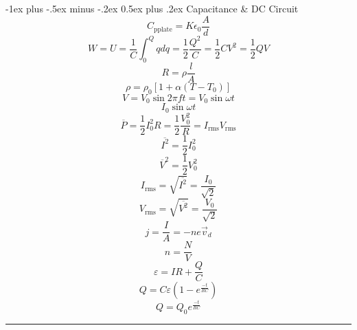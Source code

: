\documentclass[12pt,landscape]{article}
\makeatletter
\renewcommand{\section}{\@startsection{section}{1}{0mm}%
                                {-1ex plus -.5ex minus -.2ex}%
                                {0.5ex plus .2ex}%
                                {\normalfont\large\bfseries}}
\renewcommand{\subsection}{\@startsection{subsection}{2}{0mm}%
                                {-1explus -.5ex minus -.2ex}%
                                {0.5ex plus .2ex}%
                                {\normalfont\normalsize\bfseries}}
\makeatother
\begin{document}
\begin{multicols}{3}
\section{Capacitance \& DC Circuit}
\begin{equation*}
    C_{\text{pplate}} = K \epsilon_0 \frac{A}{d}
\end{equation*}
\begin{equation*}
    W = U = \frac{1}{C} \int_{0}^{Q} q dq = \frac{1}{2}\frac{Q^2}{C} = \frac{1}{2} CV^2 = \frac{1}{2}QV
\end{equation*}
\begin{equation*}
    R = \rho \frac{l}{A}
\end{equation*}
\begin{equation*}
    \rho = \rho_0 [1 + \alpha(T - T_0)]
\end{equation*}
\begin{equation*}
    V = V_0 \sin{2\pi f} t = V_0 \sin{\omega t}
\end{equation*}
\begin{equation*}
    I_0 \sin{\omega t}
\end{equation*}
\begin{equation*}
    \overbar{P} = \frac{1}{2} I_0^2 R = \frac{1}{2} \frac{V_0^2}{R}= I_{\text{rms}} V_{\text{rms}}
\end{equation*}
\begin{equation*}
    \overbar{I^2} = \frac{1}{2} I_0^2
\end{equation*}
\begin{equation*}
    \overbar{V}^2 = \frac{1}{2} V_0^2
\end{equation*}
\begin{equation*}
    I_{\text{rms}} = \sqrt{\overbar{I^2}} = \frac{I_0}{\sqrt{2}}
\end{equation*}
\begin{equation*}
    V_{\text{rms}} = \sqrt{\overbar{V^2}} = \frac{V_0}{\sqrt{2}}
\end{equation*}
\begin{equation*}
    j = \frac{I}{A} = -n e \vec{v}_d 
\end{equation*}
\begin{equation*}
    n = \frac{N}{V}
\end{equation*}
\begin{equation*}
    \varepsilon = IR + \frac{Q}{C}
\end{equation*}
\begin{equation*}
    Q = C\varepsilon \left(1 - e^{\frac{-t}{RC}} \right)
\end{equation*}
\begin{equation*}
    Q = Q_0 e^{\frac{-t}{RC}}
\end{equation*}



\rule{0.3\linewidth}{0.25pt}
\scriptsize


\end{multicols}
\end{document}
